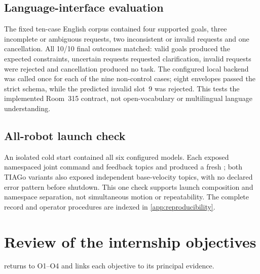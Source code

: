 \subsection{Language-interface evaluation}
\label{sec:language-contract-evidence}

The fixed ten-case English corpus contained four supported goals, three
incomplete or ambiguous requests, two inconsistent or invalid requests and one
cancellation. All 10/10 final outcomes matched: valid goals produced the
expected constraints, uncertain requests requested clarification, invalid
requests were rejected and cancellation produced no task. The configured local
backend was called once for each of the nine non-control cases; eight envelopes
passed the strict schema, while the predicted invalid slot~9 was rejected. This
tests the implemented Room~315 contract, not open-vocabulary or multilingual
language understanding.

\subsection{All-robot launch check}

An isolated  cold start contained all six configured models.
Each exposed namespaced joint command and feedback topics and produced a fresh
; both TIAGo variants also exposed independent base-velocity
topics, with no declared error pattern before shutdown. This one check supports
launch composition and namespace separation, not simultaneous motion or
repeatability. The complete record and operator procedures are indexed in
\cref{app:reproducibility}.

\section{Review of the internship objectives}

 returns to O1--O4 and links each objective to its
principal evidence.

